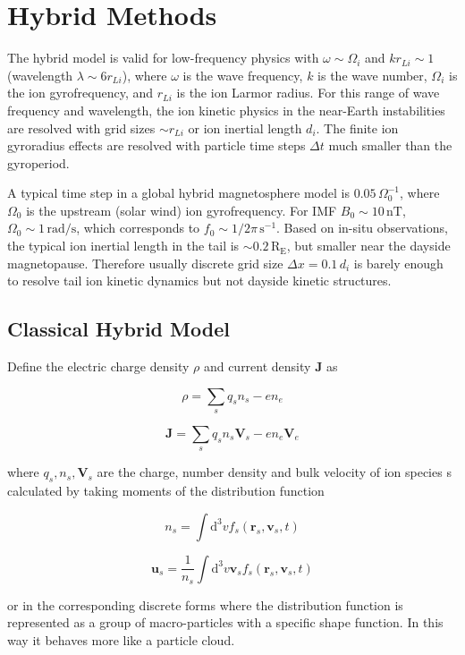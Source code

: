 \documentclass[
  notoc %
]{tufte-book}
\begin{document}
\hypertarget{sec:hybrid}{%
\chapter{Hybrid Methods}\label{sec:hybrid}}

The hybrid model is valid for low-frequency physics with
\(\omega\sim\Omega_i\) and \(kr_{Li}\sim 1\) (wavelength
\(\lambda\sim 6r_{Li}\)), where \(\omega\) is the wave frequency, \(k\)
is the wave number, \(\Omega_i\) is the ion gyrofrequency, and
\(r_{Li}\) is the ion Larmor radius. For this range of wave frequency
and wavelength, the ion kinetic physics in the near-Earth instabilities
are resolved with grid sizes \(\sim r_{Li}\) or ion inertial length
\(d_i\). The finite ion gyroradius effects are resolved with particle
time steps \(\Delta t\) much smaller than the gyroperiod.

A typical time step in a global hybrid magnetosphere model is
\(0.05\,\Omega_0^{-1}\), where \(\Omega_0\) is the upstream (solar wind)
ion gyrofrequency. For IMF \(B_0\sim10\,\text{nT}\),
\(\Omega_0 \sim 1\,\text{rad/s}\), which corresponds to
\(f_0\sim 1/2\pi\,\text{s}^{-1}\). Based on in-situ observations, the
typical ion inertial length in the tail is
\(\sim 0.2\,\text{R}_\text{E}\), but smaller near the dayside
magnetopause. Therefore usually discrete grid size
\(\Delta x = 0.1\,d_i\) is barely enough to resolve tail ion kinetic
dynamics but not dayside kinetic structures.

\hypertarget{classical-hybrid-model}{%
\section{Classical Hybrid Model}\label{classical-hybrid-model}}

Define the electric charge density \(\rho\) and current density
\(\mathbf{J}\) as

\[
\rho = \sum_s q_s n_s - en_e
\]

\[
\mathbf{J} = \sum_s q_s n_s \mathbf{V}_s - e n_e \mathbf{V}_e
\]

where \(q_s, n_s, \mathbf{V}_s\) are the charge, number density and bulk
velocity of ion species s calculated by taking moments of the
distribution function

\[
n_s = \int \mathrm{d}^3 v f_s(\mathbf{r}_s,\mathbf{v}_s,t)
\]

\[
\mathbf{u}_s = \frac{1}{n_s}\int \mathrm{d}^3 v \mathbf{v}_s f_s(\mathbf{r}_s,\mathbf{v}_s,t)
\]

or in the corresponding discrete forms where the distribution function
is represented as a group of macro-particles with a specific shape
function. In this way it behaves more like a particle cloud.
\end{document}
